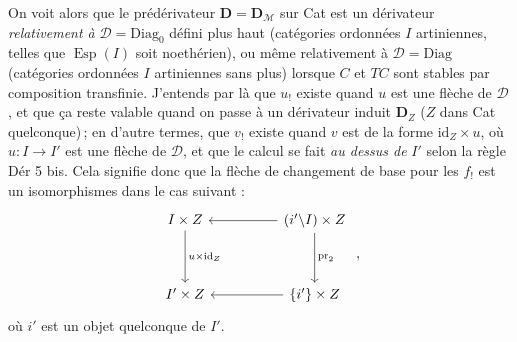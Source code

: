 \documentclass[11pt]{article}
\newcommand{\msp}[1]{\marginpar{\footnotesize [#1]}}
\newcommand{\M}{\mathcal{M}}
\newcommand{\Esp}{\operatorname{Esp}}
\newcommand{\id}{\mathrm{id}}
\newcommand{\pr}{\mathrm{pr}}
\begin{document}
On voit alors que le prédérivateur $\mathbf{D} = \mathbf{D}_{\M}$ sur Cat est un dérivateur \textit{relativement à} $\mathcal{D} = \mathrm{Diag}_0$ défini plus haut (catégories ordonnées $I$ artiniennes, telles que $\Esp(I)$ soit noethérien), ou même relativement à $\mathcal{D} = \mathrm{Diag}$ (catégories ordonnées $I$ artiniennes sans plus) lorsque $C$ et $TC$ sont stables par composition transfinie. J'entends par là que $u_!$ existe quand $u$ est une flèche de $\mathcal{D}$,
\msp{page 70}
et que ça reste valable quand on passe à un dérivateur induit $\mathbf{D}_Z$ ($Z$ dans Cat quelconque)\,; en d'autre termes, que $v_!$ existe quand $v$ est de la forme $\id_Z\times u$, où $u : I\longrightarrow I'$ est une %
flèche de $\mathcal{D}$, et que le calcul se fait \textit{au dessus de} $I'$ selon la règle Dér 5 bis. Cela signifie donc que la flèche de changement de base pour les $f_!$ est un isomorphismes dans le cas %
suivant :
\[
\begin{tikzcd}[row sep=huge, column sep=huge]
I\times Z \arrow[d, "u\times\id_Z"] & (i'\backslash I)\times Z \arrow[l] \arrow[d, "\pr_2"] \\
I'\times Z & \{i'\}\times Z \arrow[l]
\end{tikzcd}
\ ,
\]
où $i'$ est un objet quelconque de $I'$.
\end{document}
